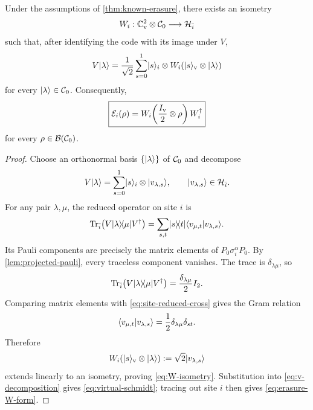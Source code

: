 \begin{theorem}
\label{thm:virtual-qubit}
Under the assumptions of \cref{thm:known-erasure}, there exists an isometry
\begin{equation}
  W_i:\mathbb C^2_{\mathrm v}\otimes\mathcal C_0
  \longrightarrow\mathcal H_{\bar i}
  \label{eq:W-isometry}
\end{equation}
such that, after identifying the code with its image under $V$,
\begin{equation}
  V\lvert \lambda\rangle
  =\frac{1}{\sqrt2}\sum_{s=0}^1
  \lvert s\rangle_i\otimes W_i(\lvert s\rangle_{\mathrm v}\otimes\lvert \lambda\rangle)
  \label{eq:virtual-schmidt}
\end{equation}
for every $\lvert \lambda\rangle\in\mathcal C_0$.  Consequently,
\begin{equation}
  \boxed{
  \mathcal E_i(\rho)
  =W_i\!\left(\frac{I_{\mathrm v}}2\otimes\rho\right)W_i^\dagger
  }
  \label{eq:erasure-W-form}
\end{equation}
for every $\rho\in\mathcal B(\mathcal C_0)$.
\end{theorem}

\begin{proof}
Choose an orthonormal basis $\{\lvert \lambda\rangle\}$ of $\mathcal C_0$ and decompose
\begin{equation}
  V\lvert \lambda\rangle
  =\sum_{s=0}^1\lvert s\rangle_i\otimes\lvert v_{\lambda,s}\rangle,
  \qquad
  \lvert v_{\lambda,s}\rangle\in\mathcal H_{\bar i}.
  \label{eq:v-decomposition}
\end{equation}
For any pair $\lambda,\mu$, the reduced operator on site $i$ is
\begin{equation}
  \operatorname{Tr}_{\bar i}\!\left(
  V\lvert \lambda\rangle\!\langle \mu\rvert V^\dagger
  \right)
  =\sum_{s,t}\lvert s\rangle\!\langle t\rvert
  \langle v_{\mu,t}\vert v_{\lambda,s}\rangle.
  \label{eq:site-reduced-cross}
\end{equation}
Its Pauli components are precisely the matrix elements of $P_0\sigma_i^\alpha P_0$.  By \cref{lem:projected-pauli}, every traceless component vanishes.  The trace is $\delta_{\lambda\mu}$, so
\begin{equation}
  \operatorname{Tr}_{\bar i}\!\left(
  V\lvert \lambda\rangle\!\langle \mu\rvert V^\dagger
  \right)
  =\frac{\delta_{\lambda\mu}}2 I_2.
\end{equation}
Comparing matrix elements with \cref{eq:site-reduced-cross} gives the Gram relation
\begin{equation}
  \langle v_{\mu,t}\vert v_{\lambda,s}\rangle
  =\frac12\delta_{\lambda\mu}\delta_{st}.
  \label{eq:gram-relation}
\end{equation}
Therefore
\begin{equation}
  W_i(\lvert s\rangle_{\mathrm v}\otimes\lvert \lambda\rangle)
  :=\sqrt2\lvert v_{\lambda,s}\rangle
\end{equation}
extends linearly to an isometry, proving \cref{eq:W-isometry}.  Substitution into \cref{eq:v-decomposition} gives \cref{eq:virtual-schmidt}; tracing out site $i$ then gives \cref{eq:erasure-W-form}.
\end{proof}

